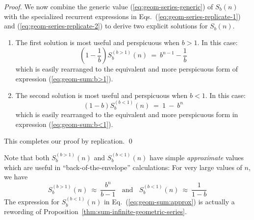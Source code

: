 \begin{proof}
\medskip

We now combine the generic value (\ref{eq:geom-series-generic}) of $S_b(n)$ with the specialized recurrent expressions in Eqs.~(\ref{eq:geom-series-replicate-1}) and (\ref{eq:geom-series-replicate-2}) to derive two explicit solutions for $S_b(n)$.
\begin{enumerate}
\item
The first solution is most useful and perspicuous when $b>1$.  In this case:
\[ \left( 1 - \frac{1}{b} \right)  S^{(b>1)}_{b}(n) \ = \ b^{n-1} - \frac{1}{b} \]
which is easily rearranged to the equivalent and more perspicuous form of expression
(\ref{eq:geom-sum:b>1}).

\medskip\item
The second solution is most useful and perspicuous when $b < 1$.  In this case:
\[ (1-b) S^{(b<1)}_{b}(n) \ = \ 1 \ - \ b^n \]
which is easily rearranged to the equivalent and more perspicuous form in expression
(\ref{eq:geom-sum:b<1}).
\end{enumerate}
This completes our proof by replication.  \qed
\end{proof}

\medskip

Note that both $S^{(b>1)}_{b}(n)$ and $S^{(b<1)}_{b}(n)$ have simple {\em approximate} values which are useful in ``back-of-the-envelope'' calculations: For very large values of $n$, we have
\begin{equation}
\label{eq:geom-sum:approx}
S^{(b>1)}_{b}(n) \ \approx \ \frac{b^n}{b-1} \ \ \ \
\mbox{and} \ \ \ \
S^{(b<1)}_{b}(n) \ \approx \ \frac{1}{1-b} 
\end{equation}
The expression for $S^{(b<1)}_{b}(n)$ in Eq.~(\ref{eq:geom-sum:approx}) is actually a rewording of Proposition~\ref{thm:sum-infinite-geometric-series}.

\medskip

